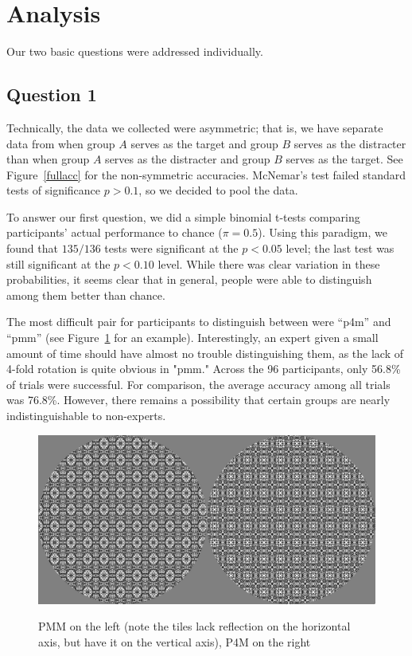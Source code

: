 \section{Analysis}
Our two basic questions were addressed individually.

\subsection{Question 1}
Technically, the data we collected were asymmetric; that is, we have separate data from when group $A$ serves as the target and group $B$ serves as the distracter than when group $A$ serves as the distracter and group $B$ serves as the target. See Figure~\ref{fullacc} for the non-symmetric accuracies. McNemar's test failed standard tests of significance $p > 0.1$, so we decided to pool the data. 

To answer our first question, we did a simple binomial t-tests comparing participants' actual performance to chance ($\pi=0.5$). Using this paradigm, we found that $135/136$ tests were significant at the $p<0.05$ level; the last test was still significant at the $p<0.10$ level. While there was clear variation in these probabilities, it seems clear that in general, people were able to distinguish among them better than chance. 

The most difficult pair for participants to distinguish between were “p4m” and “pmm” (see Figure~\ref{pmmp4m} for an example). Interestingly, an expert given a small amount of time should have almost no trouble distinguishing them, as the lack of 4-fold rotation is quite obvious in "pmm." Across the 96 participants, only 56.8\% of trials were successful. For comparison, the average accuracy among all trials was 76.8\%. However, there remains a possibility that certain groups are nearly indistinguishable to non-experts.

\begin{figure}[!ht]
\centering
\includegraphics[width=0.9\columnwidth]{pmmp4m}
\label{pmmp4m}
\caption{PMM on the left (note the tiles lack reflection on the horizontal axis, but have it on the vertical axis), P4M on the right}
\end{figure}

